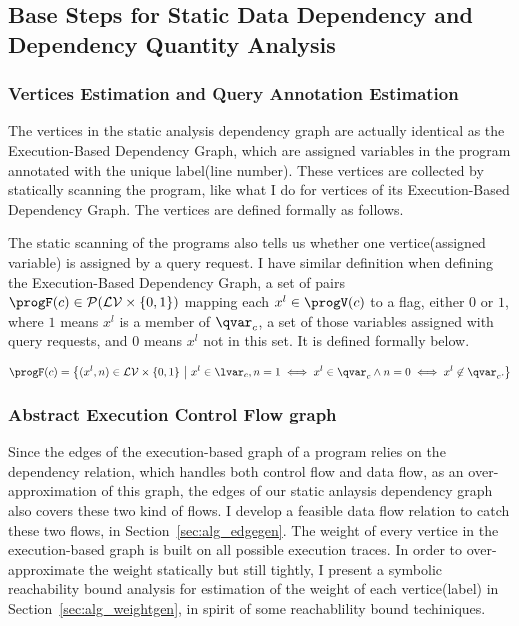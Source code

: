 %
\subsection{Base Steps for Static Data Dependency and Dependency Quantity Analysis}
\label{sec:alg_weightedgegen}
\subsubsection{Vertices Estimation and Query Annotation Estimation}
\label{sec:alg_vertexgen}
The vertices in the static analysis dependency graph are actually identical as the  Execution-Based Dependency Graph, which are assigned variables in the program annotated with the unique label(line number). These vertices are collected by statically scanning the program, like what I do for vertices of its Execution-Based Dependency Graph. The vertices are defined formally as follows.


The static scanning of the programs also tells us whether one vertice(assigned variable) is assigned by a query request.  I have similar definition when defining the Execution-Based Dependency Graph, 
a set of pairs $\progF(c) \in \mathcal{P}(\mathcal{LV} \times \{0, 1\} )$ 
mapping each $x^l \in \progV(c)$ to a flag, either $0$ or $1$, where $1$  means $x^{l}$ is a member of $ \qvar_{c}$, a set of those variables assigned with query requests, and $0$ means $x^{l}$ not in this set. It is defined formally below.

\[\progF(c) =\left\{(x^l, n)  \in  \mathcal{LV} \times \{0, 1\} 
~ \middle\vert ~
x^l \in \lvar_{c},
n = 1 \iff x^l \in \qvar_{c} \land n = 0 \iff  x^l \not\in \qvar_{c} .
\right\}\]
%
\subsubsection{Abstract Execution Control Flow graph}
Since the edges of the execution-based graph of a program relies on the dependency relation, which handles both control flow and data flow, as an over-approximation of this graph, the edges of our static anlaysis dependency graph also covers these two kind of flows.  I develop a feasible data flow relation to catch these two flows, in Section~\ref{sec:alg_edgegen}.
%
The weight of every vertice in the execution-based graph is built on all possible execution traces.
In order to over-approximate the weight statically but still tightly, I present a symbolic reachability bound analysis for estimation of the weight of each vertice(label) in Section~\ref{sec:alg_weightgen},
in spirit of some reachablility bound techiniques.


